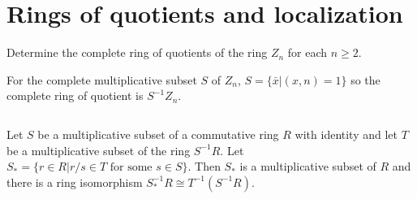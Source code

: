 \section{Rings of quotients and localization}
\begin{ex}
    Determine the complete ring of quotients of the ring $Z_{n}$ for each $n\geq 2$.
\end{ex}

\begin{answer}
    For the complete multiplicative subset $S$ of $Z_{n}$, $S=\{\bar{x}|(x,n)=1\}$ so the complete ring of quotient is $S^{-1}Z_{n}$.
\end{answer}

$$ $$

\begin{ex}
    Let $S$ be a multiplicative subset of a commutative ring $R$ with identity and let $T$ be a multiplicative subset of the ring $S^{-1}R$. Let $S_{*}=\{r\in R|r /s\in T \text{ for some }s\in S\}$. Then $S_{*}$ is a multiplicative subset of $R$ and there is a ring isomorphism $S_{*}^{-1}R\cong T^{-1}(S^{-1}R)$.
\end{ex}

